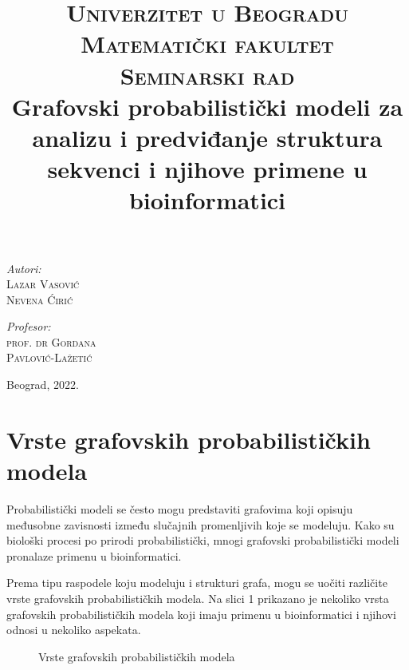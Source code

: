 \documentclass[a4paper, 12pt]{article}
\title{\textsc{Univerzitet u Beogradu \\ Matematički fakultet} \\ \vspace{2cm} {\small \textsc{Seminarski rad}} \\ \vspace{0.3cm} Grafovski probabilistički modeli za analizu i predviđanje struktura sekvenci i njihove primene u bioinformatici \\}
\date{}
\begin{document}
\maketitle
\thispagestyle{empty}

\vspace{8cm}

\begin{minipage}[t]{5cm}
\textit{Autori:} \\
\textsc{Lazar Vasović}\\
\textsc{Nevena Ćirić}\\
\end{minipage}
\hfill
\begin{minipage}[t]{5cm}
\hfill  \textit{Profesor:} \\
\hfill  \textsc{prof. dr Gordana}\\
\hfill  \textsc{Pavlović-Lažetić} \\
\end{minipage}

\vspace{2cm}

\begin{center}
Beograd, 2022.
\end{center}

\newpage

\section{Vrste grafovskih probabilističkih modela}

Probabilistički modeli se često mogu predstaviti grafovima koji opisuju međusobne zavisnosti između slučajnih promenljivih koje se modeluju. Kako su biološki procesi po prirodi probabilistički, mnogi grafovski probabilistički modeli pronalaze primenu u bioinformatici.

Prema tipu raspodele koju modeluju i strukturi grafa, mogu se uočiti različite vrste grafovskih probabilističkih modela. Na slici 1 prikazano je nekoliko vrsta grafovskih probabilističkih modela koji imaju primenu u bioinformatici i njihovi odnosi u nekoliko aspekata.

\begin{figure}[h!]
    \centering
    \vspace{0.3cm}
    \vspace{0.15cm}
    \caption{Vrste grafovskih probabilističkih modela}
    \vspace{0.3cm}
\end{figure}
\end{document}
